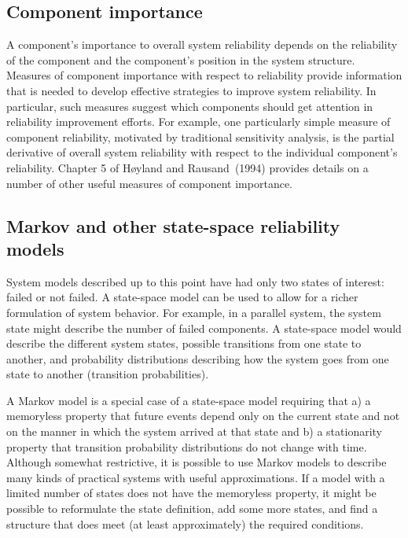 \subsection{Component importance}
A component's importance to overall system reliability depends on
the reliability of the component and the component's position in the
system structure.  Measures of component importance with respect to
reliability provide information that is needed to develop effective
strategies to improve system reliability. In particular, such
measures suggest which components should get attention in
reliability improvement efforts.  For example, one particularly
simple measure of component reliability, motivated by traditional
sensitivity analysis, is the partial derivative of overall system
reliability with respect to the individual component's reliability.
Chapter 5 of H\o yland and Rausand~(1994) provides details on a
number of other useful measures of component importance.

\subsection{Markov and other state-space reliability models}

System models described up to this point have had only two states of
interest: failed or not failed. A state-space model can be used to
allow for a richer formulation of system behavior. For example, in a
parallel system, the system state might describe the number of
failed components. A state-space model would describe the
different system states, possible transitions from one state to
another, and probability distributions describing how the system
goes from one state to another (transition probabilities).
 
A Markov model is a special case of a state-space model requiring
that a) a memoryless property that future events depend only on the
current state and not on the manner in which the system arrived at
that state and b) a stationarity property that transition
probability distributions do not change with time. Although somewhat
restrictive, it is possible to use Markov models to describe many
kinds of practical systems with useful approximations. If a
model with a limited number of states does not have the memoryless
property, it might be possible to reformulate the state definition,
add some more states, and find a structure that does meet (at least
approximately) the required conditions.

